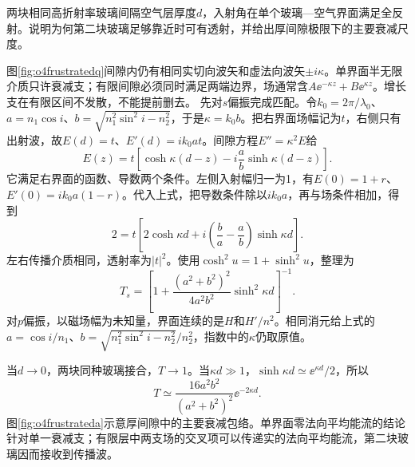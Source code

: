 \begin{example}\label{ex:o4frustrated}
两块相同高折射率玻璃间隔空气层厚度$d$，入射角在单个玻璃—空气界面满足全反射。说明为何第二块玻璃足够靠近时可有透射，并给出厚间隙极限下的主要衰减尺度。
\end{example}
\begin{solution}
图\ref{fig:o4frustratedq}间隙内仍有相同实切向波矢和虚法向波矢$\pm i\kappa$。单界面半无限介质只许衰减支；有限间隙必须同时满足两端边界，场通常含$A\ee^{-\kappa z}+B\ee^{\kappa z}$。增长支在有限区间不发散，不能提前删去。
先对$s$偏振完成匹配。令$k_0=2\pi/\lambda_0$、$a=n_1\cos i$、$b=\sqrt{n_1^2\sin^2i-n_2^2}$，于是$\kappa=k_0b$。把右界面场幅记为$t$，右侧只有出射波，故$E(d)=t$、$E'(d)=ik_0at$。间隙方程$E''=\kappa^2E$给
\[
 E(z)=t\left[\cosh\kappa(d-z)
 -i\frac ab\sinh\kappa(d-z)\right].
\]
它满足右界面的函数、导数两个条件。左侧入射幅归一为1，有$E(0)=1+r$、$E'(0)=ik_0a(1-r)$。代入上式，把导数条件除以$ik_0a$，再与场条件相加，得到
\[
 2=t\left[2\cosh\kappa d
 +i\left(\frac ba-\frac ab\right)\sinh\kappa d\right].
\]
左右传播介质相同，透射率为$|t|^2$。使用$\cosh^2u=1+\sinh^2u$，整理为
\[
 T_s=\left[1+\frac{(a^2+b^2)^2}{4a^2b^2}
 \sinh^2\kappa d\right]^{-1}.
\]
对$p$偏振，以磁场幅为未知量，界面连续的是$H$和$H'/n^2$。相同消元给上式的$a=\cos i/n_1$、$b=\sqrt{n_1^2\sin^2i-n_2^2}/n_2^2$，指数中的$\kappa$仍取原值。

当$d\to0$，两块同种玻璃接合，$T\to1$。当$\kappa d\gg1$，$\sinh\kappa d\simeq\ee^{\kappa d}/2$，所以
\[
 T\simeq\frac{16a^2b^2}{(a^2+b^2)^2}\ee^{-2\kappa d}.
\]
图\ref{fig:o4frustrateda}示意厚间隙中的主要衰减包络。单界面零法向平均能流的结论针对单一衰减支；有限层中两支场的交叉项可以传递实的法向平均能流，第二块玻璃因而接收到传播波。
\end{solution}





